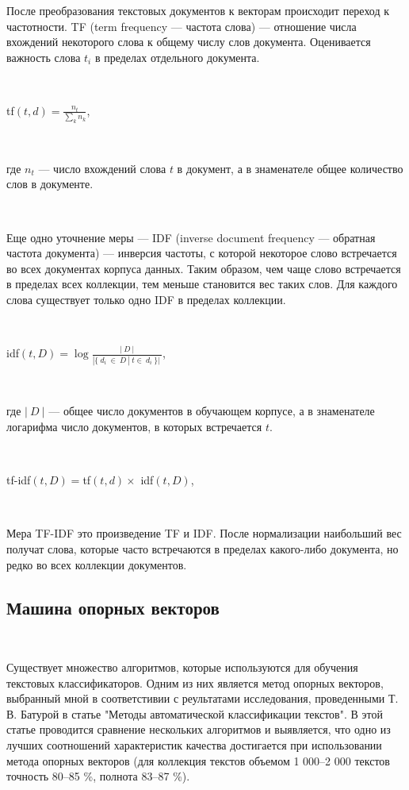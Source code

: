 После преобразования текстовых документов к векторам происходит переход к частотности. TF (term frequency — частота слова) — отношение числа вхождений некоторого слова к общему числу слов документа. Оценивается важность слова $t_{i}$ в пределах отдельного документа.

\

\large tf$(t, d) = \frac{n_{t}}{\sum_{k}n_{k}}$, \normalsize

\

где $n_{t}$ — число вхождений слова $t$ в документ, а в знаменателе общее количество слов в документе.

\

Еще одно уточнение меры — IDF (inverse document frequency — обратная частота документа) — инверсия частоты, с которой некоторое слово встречается во всех документах корпуса данных. Таким образом, чем чаще слово встречается в пределах всех коллекции, тем меньше становится вес таких слов. Для каждого слова существует только одно IDF в пределах коллекции.

\

\large idf$(t, D) = \log\frac{|\:D\:|}{| \{ \: d_{i} \: \in \: D \: | \: t \in \: d_{i} \: \}| \:}$, \normalsize

\

где $|\:D\:|$ — общее число документов в обучающем корпусе, а в знаменателе логарифма число документов, в которых встречается $t$.

\

\large tf-idf$(t, D) = $tf$(t, d) \times$ idf$(t, D)$, \normalsize

\

Мера TF-IDF это произведение TF и IDF. После нормализации наибольший вес получат слова, которые часто встречаются в пределах какого-либо документа, но редко во всех коллекции документов. 

\newpage
\subsection{Машина опорных векторов}
\

Существует множество алгоритмов, которые используются для обучения текстовых классификаторов. Одним из них является метод опорных векторов, выбранный мной в соответстивии с реультатами исследования, проведенными Т. В. Батурой в статье "Методы автоматической классификации текстов".\cite{TEXTCLASSIFICATION} В этой статье проводится сравнение нескольких алгоритмов и выявляется, что одно из лучших соотношений характеристик качества достигается при использовании метода опорных векторов (для коллекция текстов объемом 1 000–2 000 текстов точность 80–85 \%, полнота 83–87 \%).

